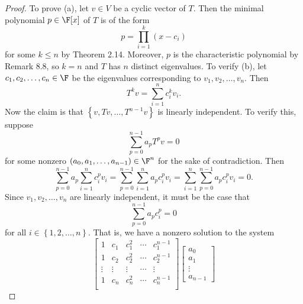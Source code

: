 \documentclass[linearalgebra]{subfiles}
\begin{document}
    \begin{proof}
        To prove (a), let $v\in V$ be a cyclic vector of $T$. Then the minimal polynomial $p\in\F[x]$ of $T$ is of the form
        \begin{equation*}
            p = \prod^{k}_{i=1} (x-c_i)
        \end{equation*}
        for some $k\leq n$ by Theorem 2.14. Moreover, $p$ is the characteristic polynomial by Remark 8.8, so $k=n$ and $T$ has $n$ distinct eigenvalues. To verify (b), let $c_1, c_2, \ldots, c_n\in\F$ be the eigenvalues corresponding to $v_1, v_2, \ldots, v_n$. Then
        \begin{equation*}
            T^kv = \sum^{n}_{i=1} c_i^kv_i.
        \end{equation*}
        Now the claim is that $\left\lbrace v, Tv, \ldots, T^{n-1}v \right\rbrace$ is linearly independent. To verify this, suppose
        \begin{equation*}
            \sum^{n-1}_{p=0} a_pT^pv = 0
        \end{equation*}
        for some nonzero $\left( a_0, a_1, \ldots, a_{n-1} \right)\in\F^n$ for the sake of contradiction. Then
        \begin{equation*}
            \sum^{n-1}_{p=0} a_p \sum^{n}_{i=1} c_i^pv_i = \sum^{n-1}_{p=0} \sum^{n}_{i=1} a_pc_i^pv_i = \sum^{n}_{i=1} \sum^{n-1}_{p=0} a_pc_i^pv_i = 0.
        \end{equation*}
        Since $v_1, v_2, \ldots, v_n$ are linearly independent, it must be the case that
        \begin{equation*}
            \sum^{n-1}_{p=0} a_pc_i^p = 0
        \end{equation*}
        for all $i\in \left\lbrace 1, 2, \ldots, n \right\rbrace$. That is, we have a nonzero solution to the system
        \begin{equation*}
            \begin{bmatrix}
                1 & c_1 & c_1^2 & \cdots & c_1^{n-1} \\
                1 & c_2 & c_2^2 & \cdots & c_2^{n-1} \\
                \vdots & \vdots & \vdots & \cdots & \vdots \\
                1 & c_n & c_n^2 & \cdots & c_n^{n-1} \\
            \end{bmatrix}
            \begin{bmatrix}
                a_0 \\ a_1 \\ \vdots \\ a_{n-1}

\end{bmatrix}
\end{equation*}
\end{proof}
\end{document}
